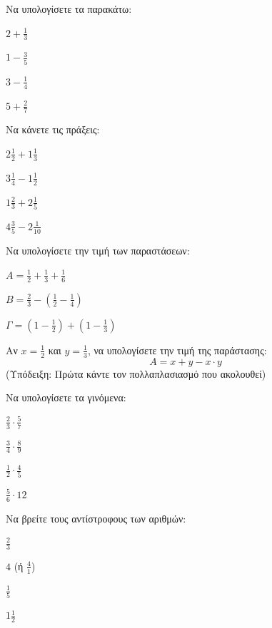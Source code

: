 \documentclass[11pt,a4paper,modern]{FFExercises}
\begin{document}
    \askhsh Να υπολογίσετε τα παρακάτω:
    \begin{alist}
        \item $2 + \frac{1}{3}$
        \item $1 - \frac{3}{5}$
        \item $3 - \frac{1}{4}$
        \item $5 + \frac{2}{7}$
    \end{alist}

    \askhsh Να κάνετε τις πράξεις:
    \begin{alist}
        \item $2 \frac{1}{2} + 1 \frac{1}{3}$
        \item $3 \frac{1}{4} - 1 \frac{1}{2}$
        \item $1 \frac{2}{3} + 2 \frac{1}{5}$
        \item $4 \frac{3}{5} - 2 \frac{1}{10}$
    \end{alist}

    \askhsh Να υπολογίσετε την τιμή των παραστάσεων:
    \begin{alist}
        \item $A = \frac{1}{2} + \frac{1}{3} + \frac{1}{6}$
        \item $B = \frac{2}{3} - (\frac{1}{2} - \frac{1}{4})$
        \item $\Gamma = (1 - \frac{1}{2}) + (1 - \frac{1}{3})$
    \end{alist}

    \askhsh Αν $x = \frac{1}{2}$ και $y = \frac{1}{3}$, να υπολογίσετε την τιμή της παράστασης:
    \[ A = x + y - x \cdot y \]
    (Υπόδειξη: Πρώτα κάντε τον πολλαπλασιασμό που ακολουθεί)

    \askhsh Να υπολογίσετε τα γινόμενα:
    \begin{alist}
        \item $\frac{2}{3} \cdot \frac{5}{7}$
        \item $\frac{3}{4} \cdot \frac{8}{9}$
        \item $\frac{1}{2} \cdot \frac{4}{5}$
        \item $\frac{5}{6} \cdot 12$
    \end{alist}

    \askhsh Να βρείτε τους αντίστροφους των αριθμών:
    \begin{alist}
        \item $\frac{2}{3}$
        \item $4$ (ή $\frac{4}{1}$)
        \item $\frac{1}{5}$
        \item $1 \frac{1}{2}$
    \end{alist}
\end{document}
